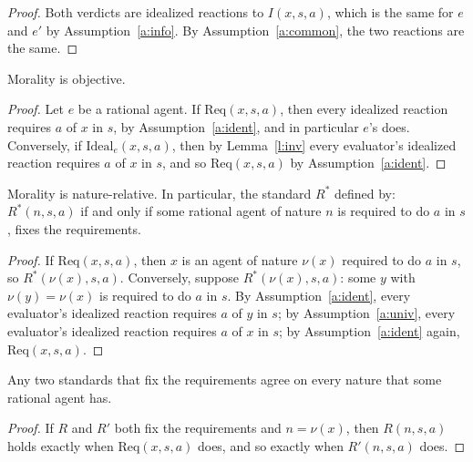 \documentclass{situationist-preprint}
\begin{document}
\begin{proof}
Both verdicts are idealized reactions to $I(x,s,a)$, which is the same for $e$ and $e'$ by Assumption~\ref{a:info}. By Assumption~\ref{a:common}, the two reactions are the same.
\end{proof}

\begin{theorem}[Objectivity]\label{t:obj}
Morality is objective.
\end{theorem}

\begin{proof}
Let $e$ be a rational agent. If $\mathrm{Req}(x,s,a)$, then every idealized reaction requires $a$ of $x$ in $s$, by Assumption~\ref{a:ident}, and in particular $e$'s does. Conversely, if $\mathrm{Ideal}_e(x,s,a)$, then by Lemma~\ref{l:inv} every evaluator's idealized reaction requires $a$ of $x$ in $s$, and so $\mathrm{Req}(x,s,a)$ by Assumption~\ref{a:ident}.
\end{proof}

\begin{proposition}[Factorization]\label{p:factor}
Morality is nature-relative. In particular, the standard $R^*$ defined by: $R^*(n,s,a)$ if and only if some rational agent of nature $n$ is required to do $a$ in $s$, fixes the requirements.
\end{proposition}

\begin{proof}
If $\mathrm{Req}(x,s,a)$, then $x$ is an agent of nature $\nu(x)$ required to do $a$ in $s$, so $R^*(\nu(x),s,a)$. Conversely, suppose $R^*(\nu(x),s,a)$: some $y$ with $\nu(y) = \nu(x)$ is required to do $a$ in $s$. By Assumption~\ref{a:ident}, every evaluator's idealized reaction requires $a$ of $y$ in $s$; by Assumption~\ref{a:univ}, every evaluator's idealized reaction requires $a$ of $x$ in $s$; by Assumption~\ref{a:ident} again, $\mathrm{Req}(x,s,a)$.
\end{proof}

\begin{proposition}\label{p:unique}
Any two standards that fix the requirements agree on every nature that some rational agent has.
\end{proposition}

\begin{proof}
If $R$ and $R'$ both fix the requirements and $n = \nu(x)$, then $R(n,s,a)$ holds exactly when $\mathrm{Req}(x,s,a)$ does, and so exactly when $R'(n,s,a)$ does.
\end{proof}
\end{document}
